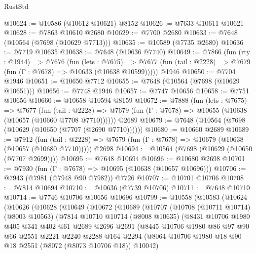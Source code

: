 \begin{lexlean}{RustStd}
\begin{coremodule}
@10624 := @10586 (@10612 @10621) @8152
@10626 := @7633 @10611 @10621
@10628 := @7863 @10610 @2680
@10629 := @7700 @2680
@10633 := @7648 (@10564 (@7698 (@10629 @7713)))
@10635 := @10589 (@7735 @2680)
@10636 := @7719 @10635
@10638 := @7648 (@10636 @7740)
@10649 := @7866
    (fun (rty : @1944) =>
    @7676
      (fun (lets : @7675) =>
      @7677 (fun (tail : @2228) => @7679 (fun (Γ : @7678) => @10633 (@10638 @10599)))))
    @1946
@10650 := @7704 @1946
@10651 := @10650 @7712
@10655 := @7648 (@10564 (@7698 (@10629 @10651)))
@10656 := @7748 @1946
@10657 := @7747 @10656
@10658 := @7751 @10656
@10660 := @10658 @10594 @8159
@10672 := @7888
    (fun (lets : @7675) =>
    @7677
      (fun (tail : @2228) =>
      @7679 (fun (Γ : @7678) => @10655 (@10638 (@10657 (@10660 @7708 @7710))))))
    @2689
@10679 := @7648 (@10564 (@7698 (@10629 (@10650 (@7707 (@2690 @7710))))))
@10680 := @10660 @2689
@10689 := @7912
    (fun (tail : @2228) => @7679 (fun (Γ : @7678) => @10679 (@10638 (@10657 (@10680 @7710)))))
    @2698
@10694 := @10564 (@7698 (@10629 (@10650 (@7707 @2699))))
@10695 := @7648 @10694
@10696 := @10680 @2698
@10701 := @7930 (fun (Γ : @7678) => @10695 (@10638 (@10657 @10696)))
@10706 := @7943 (@7981 (@7948 @90 @7982)) @7726
@10707 := @10701 @10706
@10708 := @7814 @10694
@10710 := @10636 (@7739 @10706)
@10711 := @7648 @10710
@10714 := @7746 @10706 @10656 @10696
@10799 := @10558
    (@10583
      (@10624
        (@10626
          (@10628
            (@10649
              (@10672
                (@10689
                  (@10707
                    (@10708
                      (@10711 @10714)
                      (@8003 @10563)
                      (@7814
                        @10710
                        @10714
                        (@8008 @10635)
                        (@8431
                          @10706
                          @1980
                          @405
                          @341
                          @402
                          @61
                          @2689
                          @2696
                          @2691
                          (@8445
                            @10706
                            @1980
                            @86
                            @97
                            @90
                            @66
                            @2551
                            @2221
                            @2240
                            @2288
                            @164
                            @2294
                            (@8064 @10706 @1980 @18 @90 @18 @2551 (@8072 (@8073 @10706 @18)) @10042)

\end{coremodule}
\end{lexlean}
